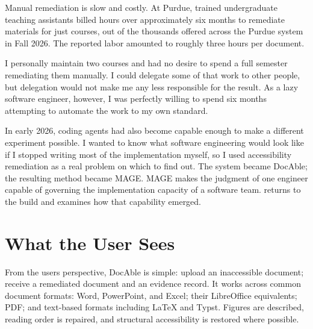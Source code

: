 Manual remediation is slow and costly. At Purdue, trained undergraduate teaching assistants billed  hours over approximately six months to remediate materials for just  courses, out of the thousands offered across the Purdue system in Fall 2026. The reported labor amounted to roughly three hours per document\citep{davis2026docable}.

I personally maintain two courses and had no desire to spend a full semester remediating them manually. I could delegate some of that work to other people, but delegation would not make me any less responsible for the result. As a lazy software engineer, however, I was perfectly willing to spend six months attempting to automate the work to my own standard.


In early 2026, coding agents had also become capable enough to make a different experiment possible. I wanted to know what software engineering would look like if I stopped writing most of the implementation myself, so I used accessibility remediation as a real problem on which to find out. The system became DocAble; the resulting method became MAGE. MAGE makes the judgment of one engineer capable of governing the implementation capacity of a software team.  returns to the build and examines how that capability emerged.

\section{What the User Sees}\label{heading:what-the-user-sees}





From the user\textquotesingle s perspective, DocAble is simple: upload an inaccessible document; receive a remediated document and an evidence record. It works across common document formats: Word, PowerPoint, and Excel; their LibreOffice equivalents; PDF; and text-based formats including LaTeX and Typst. Figures are described, reading order is repaired, and structural accessibility is restored where possible.

